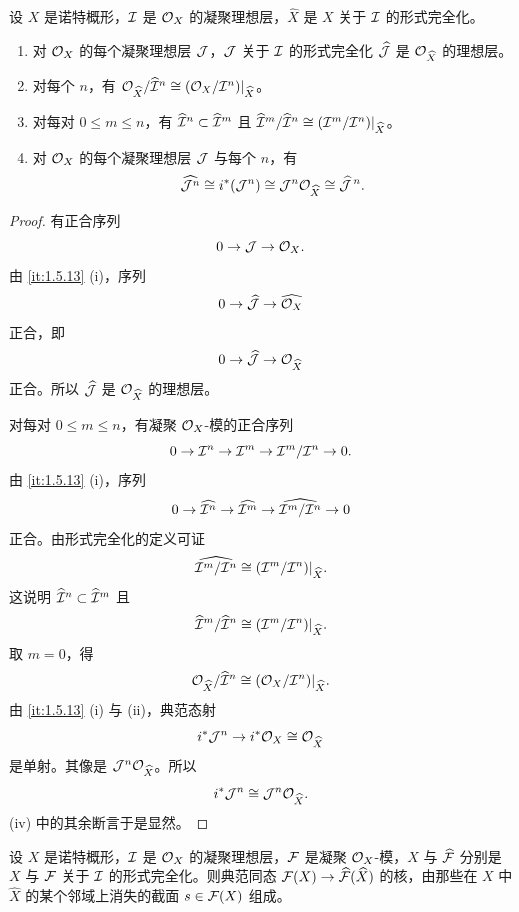 \begin{proposition}\label{it:1.5.14}
设 $X$ 是诺特概形，$\mathcal{I}$ 是 $\mathcal{O}_X$ 的凝聚理想层，$\widehat X$ 是 $X$ 关于 $\mathcal{I}$ 的形式完全化。
\begin{enumerate}[label=(\roman*),leftmargin=2.8em]
  \item 对 $\mathcal{O}_X$ 的每个凝聚理想层 $\mathcal{J}$，$\mathcal{J}$ 关于 $\mathcal{I}$ 的形式完全化 $\widehat{\mathcal{J}}$ 是 $\mathcal{O}_{\widehat X}$ 的理想层。
  \item 对每个 $n$，有 $\mathcal{O}_{\widehat X}/\widehat{\mathcal{I}}^n\cong(\mathcal{O}_X/\mathcal{I}^n)|_{\widehat X}$。
  \item 对每对 $0\le m\le n$，有 $\widehat{\mathcal{I}}^n\subset\widehat{\mathcal{I}}^m$ 且 $\widehat{\mathcal{I}}^m/\widehat{\mathcal{I}}^n\cong(\mathcal{I}^m/\mathcal{I}^n)|_{\widehat X}$。
  \item 对 $\mathcal{O}_X$ 的每个凝聚理想层 $\mathcal{J}$ 与每个 $n$，有
  \[
  \widehat{\mathcal{J}^n}\cong i^*(\mathcal{J}^n)\cong\mathcal{J}^n\mathcal{O}_{\widehat X}\cong\widehat{\mathcal{J}}^{\,n}.
  \]
\end{enumerate}
\end{proposition}

\begin{proof}
有正合序列
\[
0\to\mathcal{J}\to\mathcal{O}_X.
\]
由 \ref{it:1.5.13} (i)，序列
\[
0\to\widehat{\mathcal{J}}\to\widehat{\mathcal{O}_X}
\]
正合，即
\[
0\to\widehat{\mathcal{J}}\to\mathcal{O}_{\widehat X}
\]
正合。所以 $\widehat{\mathcal{J}}$ 是 $\mathcal{O}_{\widehat X}$ 的理想层。

对每对 $0\le m\le n$，有凝聚 $\mathcal{O}_X$-模的正合序列
\[
0\to\mathcal{I}^n\to\mathcal{I}^m\to\mathcal{I}^m/\mathcal{I}^n\to 0.
\]
由 \ref{it:1.5.13} (i)，序列
\[
0\to\widehat{\mathcal{I}^n}\to\widehat{\mathcal{I}^m}\to\widehat{\mathcal{I}^m/\mathcal{I}^n}\to 0
\]
正合。由形式完全化的定义可证
\[
\widehat{\mathcal{I}^m/\mathcal{I}^n}\cong(\mathcal{I}^m/\mathcal{I}^n)|_{\widehat X}.
\]
这说明 $\widehat{\mathcal{I}}^n\subset\widehat{\mathcal{I}}^m$ 且
\[
\widehat{\mathcal{I}}^m/\widehat{\mathcal{I}}^n\cong(\mathcal{I}^m/\mathcal{I}^n)|_{\widehat X}.
\]
取 $m=0$，得
\[
\mathcal{O}_{\widehat X}/\widehat{\mathcal{I}}^n\cong(\mathcal{O}_X/\mathcal{I}^n)|_{\widehat X}.
\]
由 \ref{it:1.5.13} (i) 与 (ii)，典范态射
\[
i^*\mathcal{J}^n\to i^*\mathcal{O}_X\cong\mathcal{O}_{\widehat X}
\]
是单射。其像是 $\mathcal{J}^n\mathcal{O}_{\widehat X}$。所以
\[
i^*\mathcal{J}^n\cong\mathcal{J}^n\mathcal{O}_{\widehat X}.
\]
(iv) 中的其余断言于是显然。
\end{proof}

\begin{proposition}\label{it:1.5.15}
设 $X$ 是诺特概形，$\mathcal{I}$ 是 $\mathcal{O}_X$ 的凝聚理想层，$\mathcal{F}$ 是凝聚 $\mathcal{O}_X$-模，$\widehat X$ 与 $\widehat{\mathcal{F}}$ 分别是 $X$ 与 $\mathcal{F}$ 关于 $\mathcal{I}$ 的形式完全化。则典范同态 $\mathcal{F}(X)\to\widehat{\mathcal{F}}(\widehat X)$ 的核，由那些在 $X$ 中 $\widehat X$ 的某个邻域上消失的截面 $s\in\mathcal{F}(X)$ 组成。
\end{proposition}


